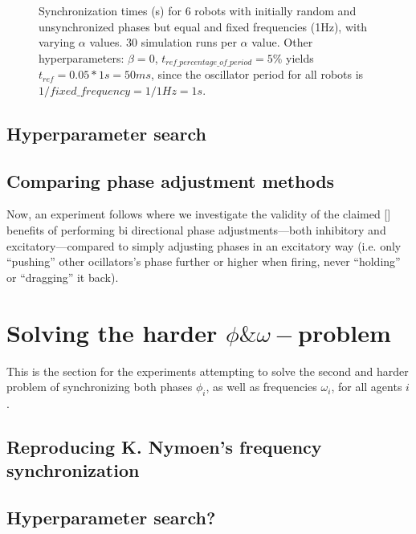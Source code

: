 	
	\begin{figure}[ht!]
		\centering
		\caption{Synchronization times (s) for 6 robots with initially random and unsynchronized phases but equal and fixed frequencies (1Hz), with varying $\alpha$ values. 30 simulation runs per $\alpha$ value. Other hyperparameters: $\beta=0$, $t_{ref\_percentage\_of\_period} = 5\%$ yields $t_{ref}=0.05*1s=50ms$, since the oscillator period for all robots is $1/fixed\_frequency=1/1Hz=1s$.}
	\end{figure}
	
	
	\subsection{Hyperparameter search}
	
	\subsection{Comparing phase adjustment methods}
	Now, an experiment follows where we investigate the validity of the claimed [] benefits of performing bi directional phase adjustments—both inhibitory and excitatory—compared to simply adjusting phases in an excitatory way (i.e. only ``pushing'' other ocillators's phase further or higher when firing, never ``holding'' or ``dragging'' it back).
	
	
	
	
	
	
	\section{Solving the harder $\phi\&\omega-$problem}
	
	This is the section for the experiments attempting to solve the second and harder problem of synchronizing both phases $\phi_i$, as well as frequencies $\omega_i$, for all agents $i$.
	
	\subsection{Reproducing K. Nymoen's frequency synchronization}
	
	\subsection{Hyperparameter search?}
